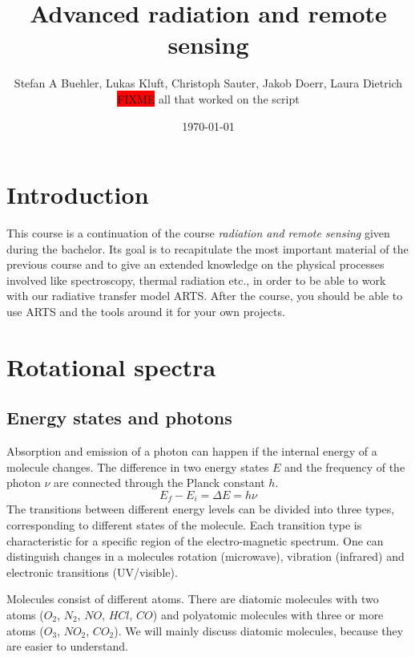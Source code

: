 \documentclass[a4paper,fleqn]{article}
\title{Advanced radiation and remote sensing}
\author{Stefan A Buehler, Lukas Kluft, Christoph Sauter, Jakob Doerr, Laura Dietrich  \colorbox{red}{FIXME} all that worked on
the script}
\date{\today}
\begin{document}
\maketitle
\thispagestyle{empty}\pagestyle{empty}
\tableofcontents
\newpage\pagestyle{fancy}

\section{Introduction}

This course is a continuation of the course \textit{radiation and remote sensing} given during the bachelor. Its goal is to recapitulate the most important material of the previous course and to give an extended knowledge on the physical processes involved like spectroscopy, thermal radiation etc., in order to be able to work with our radiative transfer model ARTS. After the course, you should be able to use ARTS and the tools around it for your own projects.


\section{Rotational spectra}

\subsection{Energy states and photons}
Absorption and emission of a photon can happen if the internal energy of a
molecule changes. The difference in two energy states $E$ and the frequency of
the photon $\nu$ are connected through the Planck constant $h$.
\begin{equation}
  E_f - E_i = \Delta E = h \nu
\end{equation}
The transitions between different energy levels can be divided into three types,
corresponding to different states of the molecule.  Each transition type is
characteristic for a specific region of the electro-magnetic spectrum.  One can
distinguish changes in a molecules rotation (microwave), vibration (infrared)
and electronic transitions (UV/visible).

Molecules consist of different atoms. There are diatomic molecules with two
atoms ($O_2$, $N_2$, $NO$, $HCl$, $CO$) and polyatomic molecules with
three or more atoms ($O_3$, $NO_2$, $CO_2$). We will mainly discuss
diatomic molecules, because they are easier to understand.
\end{document}

